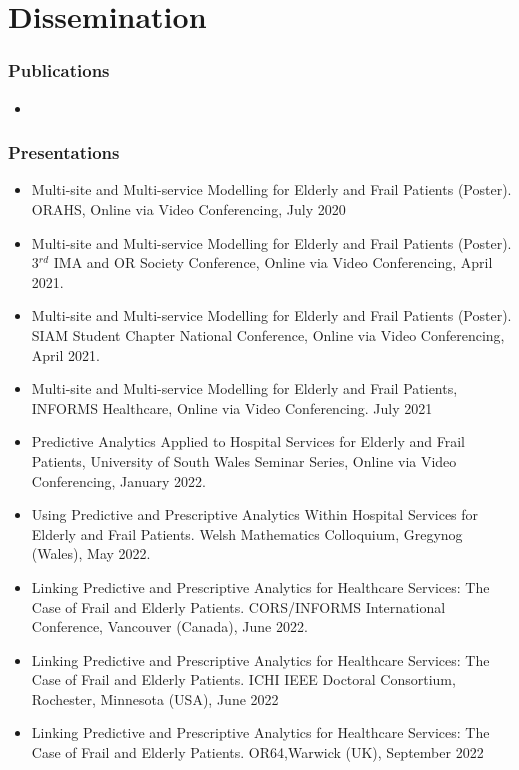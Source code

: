 \documentclass[../thesis.tex]{subfiles}
\begin{document}
\chapter*{Dissemination}
\subsection*{Publications}
\begin{itemize}
    \item \cite{Williams2021}
\end{itemize}
\subsection*{Presentations}
\begin{itemize}
    \item Multi-site and Multi-service Modelling for Elderly and Frail Patients (Poster). ORAHS, Online via Video Conferencing, July 2020
    \item Multi-site and Multi-service Modelling for Elderly and Frail Patients (Poster). 3$^{rd}$ IMA and OR Society Conference, Online via Video Conferencing, April 2021.
    \item Multi-site and Multi-service Modelling for Elderly and Frail Patients (Poster). SIAM Student Chapter National Conference, Online via Video Conferencing, April 2021.
    \item Multi-site and Multi-service Modelling for Elderly and Frail Patients, INFORMS Healthcare, Online via Video Conferencing. July 2021
    \item Predictive Analytics Applied to Hospital Services for Elderly and Frail Patients, University of South Wales Seminar Series, Online via Video Conferencing, January 2022.
    \item Using Predictive and Prescriptive Analytics Within Hospital Services for Elderly and Frail Patients. Welsh Mathematics Colloquium, Gregynog (Wales), May 2022.
    \item Linking Predictive and Prescriptive Analytics for Healthcare Services: The Case of Frail and Elderly Patients. CORS/INFORMS International Conference, Vancouver (Canada), June 2022.
    \item Linking Predictive and Prescriptive Analytics for Healthcare Services: The Case of Frail and Elderly Patients. ICHI IEEE Doctoral Consortium, Rochester, Minnesota (USA), June 2022
    \item Linking Predictive and Prescriptive Analytics for Healthcare Services: The Case of Frail and Elderly Patients. OR64,Warwick (UK), September 2022 
\end{itemize}
\vfill
\end{document}
